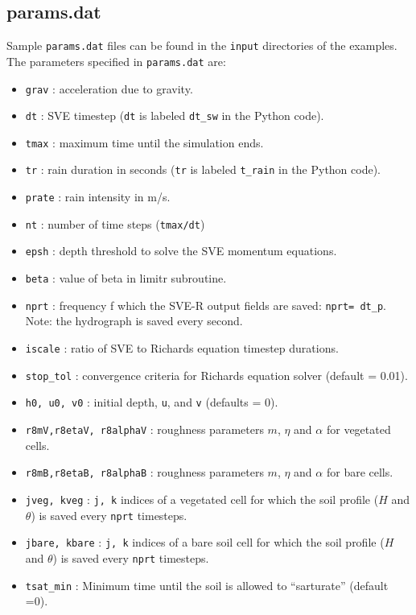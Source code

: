 \documentclass{article}
\newcommand{\code}[1]{\texttt{#1}}
\begin{document}
\subsection{params.dat}

Sample \code{params.dat} files can be found in the \code{input} directories of the examples.  The parameters specified in \code{params.dat} are:
  
\begin{itemize}
	\item \code{grav} : acceleration due to gravity.
	\item \code{dt} : SVE timestep (\code{dt} is labeled \code{dt\_sw} in the Python code). 
	\item \code{tmax} : maximum time until the simulation ends.
	\item \code{tr} : rain duration in seconds (\code{tr} is labeled \code{t\_rain} in the Python code). 
	\item \code{prate} : rain intensity in m/s.
	\item \code{nt} :  number of time steps  (\code{tmax/dt})
	\item \code{epsh} : depth threshold to solve the SVE momentum equations.
	\item \code{beta} : value of beta in limitr subroutine.
	\item \code{nprt} : frequency f which the SVE-R output fields are saved: \code{nprt= dt\_p}.  Note: the hydrograph is saved every second.
	\item \code{iscale} : ratio of SVE to Richards equation timestep durations.
	\item \code{stop\_tol} : convergence criteria for Richards equation solver (default = 0.01).
	\item \code{h0, u0, v0} : initial depth, \code{u}, and \code{v} (defaults = 0).
	\item \code{r8mV,r8etaV, r8alphaV} : roughness parameters $m$, $\eta$ and $\alpha$ for vegetated cells. 
	\item \code{r8mB,r8etaB, r8alphaB} : roughness parameters $m$, $\eta$ and $\alpha$ for bare cells. 
	\item \code{jveg, kveg} : \code{j, k} indices of a vegetated cell for which the soil profile ($H$ and $\theta$) is saved every \code{nprt} timesteps.
	\item \code{jbare, kbare} : \code{j, k} indices of a bare soil cell for which the soil profile ($H$ and $\theta$) is saved every \code{nprt} timesteps.
	\item \code{tsat\_min} : Minimum time until the soil is allowed to ``sarturate'' (default =0).
\end{itemize}
\end{document}
